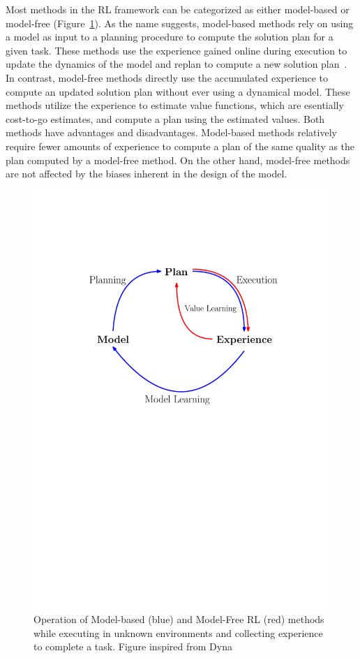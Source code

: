 Most methods in the RL framework can be categorized as either model-based
or model-free (Figure~\ref{fig:dyna}). As the name suggests, model-based methods rely on
using a model as input to a planning procedure to compute the solution
plan for a given task. These methods use the experience gained online
during execution to update the dynamics of the model and replan to
compute a new solution plan~\cite{DBLP:journals/sigart/Sutton91}. In
contrast, model-free methods directly 
use the accumulated experience to compute an updated solution plan
without ever using a dynamical model. These methods utilize the
experience to estimate value functions, which are esentially
cost-to-go estimates, and compute a plan using the estimated
values. Both methods have advantages and disadvantages. Model-based
methods relatively require fewer amounts of experience to compute a
plan of the same quality as the plan computed by a model-free
method. On the other hand, model-free methods are not affected by the biases
inherent in the design of the model.

\begin{figure}[t]
  \centering
  \includegraphics[width=0.5\linewidth]{figures/intro/dyna.pdf}
  \caption{Operation of Model-based (blue) and Model-Free RL (red) methods
    while executing in unknown environments and collecting
    experience to complete a task. Figure inspired from Dyna~\cite{DBLP:journals/sigart/Sutton91}}
  \label{fig:dyna}
\end{figure}

